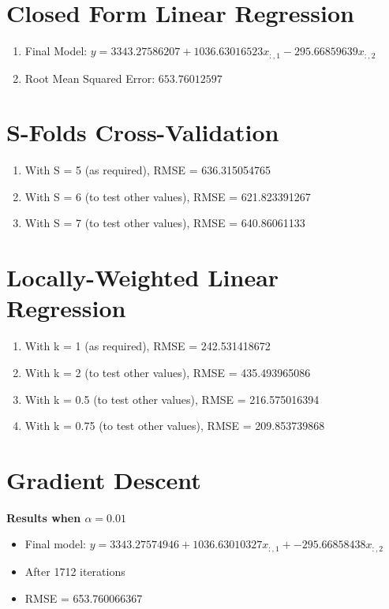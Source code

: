 \documentclass[12pt]{article}
\begin{document}
\newpage
\section{Closed Form Linear Regression}\label{linreg}

\begin{enumerate}
\item Final Model: $y=3343.27586207+1036.63016523x_{:,1} - 295.66859639x_{:,2}$
\item Root Mean Squared Error: $653.76012597$
\end{enumerate}

\section{S-Folds Cross-Validation}\label{linreg}

\begin{enumerate}
\item With S = 5 (as required), RMSE = 636.315054765
\item With S = 6 (to test other values), RMSE = 621.823391267
\item With S = 7 (to test other values), RMSE = 640.86061133
\end{enumerate}

\section{Locally-Weighted Linear Regression}
\begin{enumerate}
\item With k = 1 (as required), RMSE = 242.531418672
\item With k = 2 (to test other values), RMSE = 435.493965086
\item With k = 0.5 (to test other values), RMSE = 216.575016394
\item With k = 0.75 (to test other values), RMSE = 209.853739868
\end{enumerate}


\newpage
\section{Gradient Descent}

\textbf{Results when $\alpha=0.01$}
\begin{itemize}
\item Final model: $y = 3343.27574946 + 1036.63010327x_{:,1} + -295.66858438x_{:,2}$
\item After 1712 iterations
\item RMSE = 653.760066367
\end{itemize}
\end{document}
